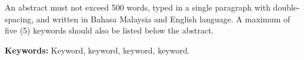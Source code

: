 An abstract must not exceed 500 words, typed in a single paragraph with double- spacing, and written in Bahasa Malaysia and English language. A maximum of five (5) keywords should also be listed below the abstract.

\textbf{Keywords: } Keyword, keyword, keyword, keyword.
